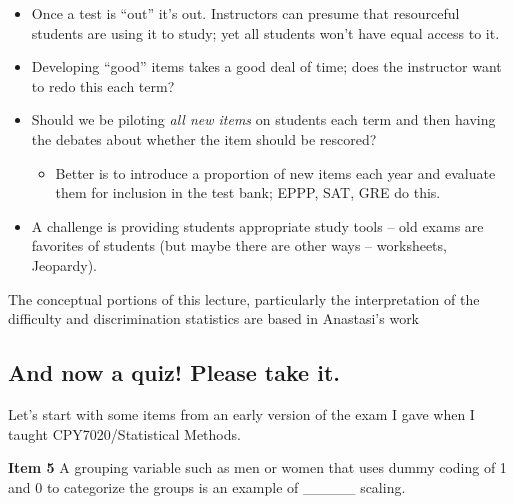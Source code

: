\documentclass[
  english,
]{book}
\providecommand{\tightlist}{%
  \setlength{\itemsep}{0pt}\setlength{\parskip}{0pt}}
\begin{document}
\begin{itemize}
\tightlist
\item
  Once a test is ``out'' it's out. Instructors can presume that resourceful students are using it to study; yet all students won't have equal access to it.
\item
  Developing ``good'' items takes a good deal of time; does the instructor want to redo this each term?
\item
  Should we be piloting \emph{all new items} on students each term and then having the debates about whether the item should be rescored?

  \begin{itemize}
  \tightlist
  \item
    Better is to introduce a proportion of new items each year and evaluate them for inclusion in the test bank; EPPP, SAT, GRE do this.
  \end{itemize}
\item
  A challenge is providing students appropriate study tools -- old exams are favorites of students (but maybe there are other ways -- worksheets, Jeopardy).
\end{itemize}

The conceptual portions of this lecture, particularly the interpretation of the difficulty and discrimination statistics are based in Anastasi's work \citep{anastasi_psychological_1997}

\hypertarget{and-now-a-quiz-please-take-it.}{%
\subsection{And now a quiz! Please take it.}\label{and-now-a-quiz-please-take-it.}}

Let's start with some items from an early version of the exam I gave when I taught CPY7020/Statistical Methods.

\textbf{Item 5} A grouping variable such as men or women that uses dummy coding of 1 and 0 to categorize the groups is an example of \_\_\_\_\_ scaling.
\end{document}
